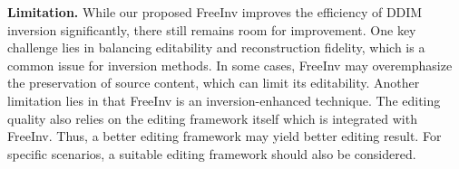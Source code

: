 \documentclass{article}
\begin{document}
\noindent \textbf{Limitation.}
While our proposed FreeInv improves the efficiency of DDIM inversion significantly, there still remains room for improvement.
One key challenge lies in balancing editability and reconstruction fidelity, which is a common issue for inversion methods. In some cases, FreeInv may overemphasize the preservation of source content, which can limit its editability. 
Another limitation lies in that FreeInv is an inversion-enhanced technique. 
The editing quality also relies on the editing framework itself which is integrated with FreeInv.
Thus, a better editing framework may yield better editing result.
For specific scenarios, a suitable editing framework should also be considered.
\clearpage
\end{document}
